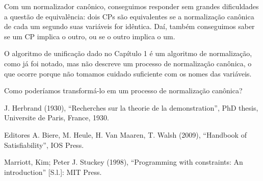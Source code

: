 \documentclass{article}
\theoremstyle{remark}
\theoremstyle{theorem}
\begin{document}
  Com um normalizador canônico, conseguimos responder sem grandes dificuldades a questão de equivalência: dois CPs são equivalentes se a normalização canônica de cada um segundo suas variáveis for idêntica. Daí, também conseguimos saber se um CP implica o outro, ou se o outro implica o um.

  O algoritmo de unificação dado no Capítulo 1 %
é um algoritmo de normalização, como já foi notado, mas não descreve um processo de normalização canônica, o que ocorre porque não tomamos cuidado suficiente com os nomes das variáveis.

Como poderíamos transformá-lo em um processo de normalização canônica?






  \begin{thebibliography}{1}

      J. Herbrand (1930), ``Recherches sur la theorie de la demonstration'', PhD thesis, Universite de Paris, France, 1930.

      Editores A. Biere, M. Heule, H. Van Maaren, T. Walsh (2009), ``Handbook of Satisfiability'', IOS Press.

      Marriott, Kim; Peter J. Stuckey (1998), ``Programming with constraints: An introduction'' [S.l.]: MIT Press.

  \end{thebibliography}
\end{document}
